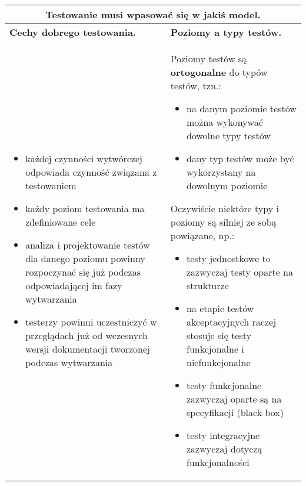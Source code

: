 \documentclass[../main.tex]{subfiles}
\begin{document}
    \begin{table}[H]
        \begin{center}
            \begin{tabular}{| p{8cm}| p{8cm}|}
                \hline
                \multicolumn{2}{|c|}{ \textbf{Testowanie musi wpasować się w jakiś model.}}\\
                \hline
                \textbf{Cechy dobrego testowania.} &  \textbf{Poziomy a typy testów.}\\
                \hline

                \begin{itemize}
                    \item każdej czynności wytwórczej odpowiada czynność związana z testowaniem
                    \item każdy poziom testowania ma zdefiniowane cele
                    \item analiza i projektowanie testów dla danego poziomu powinny rozpoczynać się już podczas odpowiadającej
                    im fazy wytwarzania
                    \item testerzy powinni uczestniczyć w przeglądach już od wczesnych wersji dokumentacji tworzonej podczas wytwarzania
                \end{itemize}
                &
                Poziomy testów są \textbf{ortogonalne} do typów testów, tzn.:
                \begin{itemize}
                    \item na danym poziomie testów można wykonywać dowolne typy testów
                    \item dany typ testów może być wykorzystany na dowolnym poziomie
                \end{itemize}
                Oczywiście niektóre typy i poziomy są silniej ze sobą powiązane, np.:
                \begin{itemize}
                    \item testy jednostkowe to zazwyczaj testy oparte na strukturze
                    \item na etapie testów akceptacyjnych raczej stosuje się testy
                    funkcjonalne i niefunkcjonalne
                    \item testy funkcjonalne zazwyczaj oparte są na specyfikacji (black-box)
                    \item testy integracyjne zazwyczaj dotyczą funkcjonalności
                \end{itemize}
                \\
                \hline
            \end{tabular}
        \end{center}
    \end{table}
\end{document}
